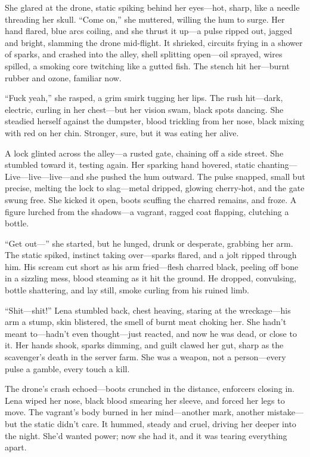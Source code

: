 \documentclass[12pt]{book}
\begin{document}
She glared at the drone, static spiking behind her eyes---hot, sharp, like a needle threading her skull. “Come on,” she muttered, willing the hum to surge. Her hand flared, blue arcs coiling, and she thrust it up---a pulse ripped out, jagged and bright, slamming the drone mid-flight. It shrieked, circuits frying in a shower of sparks, and crashed into the alley, shell splitting open---oil sprayed, wires spilled, a smoking core twitching like a gutted fish. The stench hit her---burnt rubber and ozone, familiar now.

“Fuck yeah,” she rasped, a grim smirk tugging her lips. The rush hit---dark, electric, curling in her chest---but her vision swam, black spots dancing. She steadied herself against the dumpster, blood trickling from her nose, black mixing with red on her chin. Stronger, sure, but it was eating her alive.

A lock glinted across the alley---a rusted gate, chaining off a side street. She stumbled toward it, testing again. Her sparking hand hovered, static chanting---Live---live---live---and she pushed the hum outward. The pulse snapped, small but precise, melting the lock to slag---metal dripped, glowing cherry-hot, and the gate swung free. She kicked it open, boots scuffing the charred remains, and froze. A figure lurched from the shadows---a vagrant, ragged coat flapping, clutching a bottle.

“Get out---” she started, but he lunged, drunk or desperate, grabbing her arm. The static spiked, instinct taking over---sparks flared, and a jolt ripped through him. His scream cut short as his arm fried---flesh charred black, peeling off bone in a sizzling mess, blood steaming as it hit the ground. He dropped, convulsing, bottle shattering, and lay still, smoke curling from his ruined limb.

“Shit---shit!” Lena stumbled back, chest heaving, staring at the wreckage---his arm a stump, skin blistered, the smell of burnt meat choking her. She hadn’t meant to---hadn’t even thought---just reacted, and now he was dead, or close to it. Her hands shook, sparks dimming, and guilt clawed her gut, sharp as the scavenger’s death in the server farm. She was a weapon, not a person---every pulse a gamble, every touch a kill.

The drone’s crash echoed---boots crunched in the distance, enforcers closing in. Lena wiped her nose, black blood smearing her sleeve, and forced her legs to move. The vagrant’s body burned in her mind---another mark, another mistake---but the static didn’t care. It hummed, steady and cruel, driving her deeper into the night. She’d wanted power; now she had it, and it was tearing everything apart.
\end{document}
